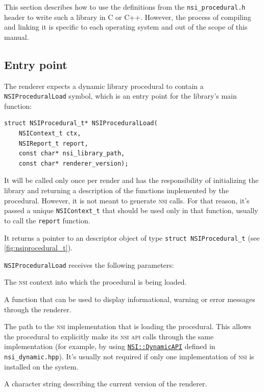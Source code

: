 \documentclass[oneside,ebook]{memoir}
\newcommand*{\acronym}[1]{\textsc{\lowercase{#1}}}
\newcommand{\paramlistitemTN}[2]{\item[#2\textcolor{lightgray}{\dotfill}#1]}
\begin{document}
This section describes how to use the definitions from the \lstinline|nsi_procedural.h| header to write such a library in C or C++.
However, the process of compiling and linking it is specific to each operating system and out of the scope of this manual.
\subsection{Entry point}
The renderer expects a dynamic library procedural to contain a \lstinline|NSIProceduralLoad| symbol, which is an entry point for the library's main function:
\begin{lstlisting}[style=CAPI]
struct NSIProcedural_t* NSIProceduralLoad(
	NSIContext_t ctx,
	NSIReport_t report,
	const char* nsi_library_path,
	const char* renderer_version);
\end{lstlisting}
It will be called only once per render and has the responsibility of initializing the library and returning a description of the functions implemented by the procedural.
However, it is not meant to generate \acronym{NSI} calls.
For that reason, it's passed a unique \lstinline|NSIContext_t| that should be used only in that function, usually to call the \lstinline|report| function.

It returns a pointer to an descriptor object of type \lstinline|struct NSIProcedural_t| (see \autoref{fig:nsiprocedural_t}).

\lstinline|NSIProceduralLoad| receives the following parameters:
\begin{paramlist}
\paramlistitemTN{NSIContext\_t}{ctx}
The \acronym{NSI} context into which the procedural is being loaded.
\paramlistitemTN{NSIReport\_t}{report}
A function that can be used to display informational, warning or error messages through the renderer.
\paramlistitemTN{const char*}{nsi\_library\_path}
The path to the \acronym{NSI} implementation that is loading the procedural.
This allows the procedural to explicitly make its \acronym{NSI} \acronym{API} calls through the same implementation (for example, by using \hyperref[dynamicapi]{\lstinline|NSI::DynamicAPI|} defined in \lstinline|nsi_dynamic.hpp|).
It's usually not required if only one implementation of \acronym{NSI} is installed on the system.
\paramlistitemTN{const char*}{renderer\_version}
A character string describing the current version of the renderer.
\end{paramlist}
\end{document}
